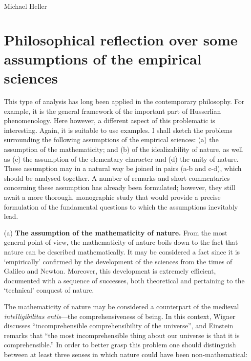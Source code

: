 \begin{artengenv}{Michael Heller}
\section{Philosophical reflection over some assumptions of the empirical sciences}

This type of analysis has long been applied in the contemporary philosophy. For example, it is the general framework
of the important part of Husserlian phenomenology. Here however, a different aspect of this problematic is interesting.
Again, it is suitable to use examples. I shall sketch the problems surrounding the following assumptions of the
empirical sciences: (a) the assumption of the mathematicity; and (b) of the idealizability of nature, as well as (c)
the assumption of the elementary character and (d) the unity of nature. These assumption may in a natural way be joined
in pairs (a-b and c-d), which should be analysed together. A number of remarks and short commentaries concerning these
assumption has already been formulated; however, they still await a more thorough, monographic study that would provide
a precise formulation of the fundamental questions to which the assumptions inevitably lead.

(a) \textbf{The assumption of the mathematicity of nature.} From the most  general point of view, the mathematicity
of nature boils down to the fact that nature can be described mathematically. It may be considered a fact since it is
`empirically' confirmed by the development of the sciences from the times of Galileo and Newton. Moreover, this
development is extremely efficient, documented with a sequence of successes, both theoretical and pertaining to the
`technical' conquest of nature.

The mathematicity of nature may be considered a counterpart of the medieval \textit{intelligibilitas entis}---the
comprehensiveness of being. In this context, %
Wigner discusses ``incomprehensible comprehensibility of the universe'', and Einstein remarks that
``the most incomprehensible thing
about our universe is that it is comprehensible.'' In order to better grasp this problem one should distinguish between
at least three senses in which nature could have been non-mathematical:


\end{artengenv}
